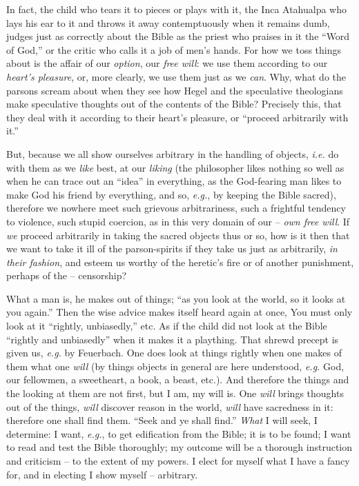 In fact, the child who tears it to pieces or plays with it, the Inca Atahualpa 
who lays his ear to it and throws it away contemptuously when it remains dumb, 
judges just as correctly about the Bible as the priest who praises in it the 
``Word of God,'' or the critic who calls it a job of men's hands. For how we 
toss things about is the affair of our \textit{option}, our \textit{free 
will}: we use them according to our \textit{heart's pleasure}, or, more 
clearly, we use them just as we \textit{can}. Why, what do the parsons scream 
about when they see how Hegel and the speculative theologians make speculative 
thoughts out of the contents of the Bible? Precisely this, that they deal with 
it according to their heart's pleasure, or ``proceed arbitrarily with it.''

But, because we all show ourselves arbitrary in the handling of objects, 
\textit{i.e.} do with them as we \textit{like} best, at our \textit{liking} 
(the philosopher likes nothing so well as when he can trace out an ``idea'' 
in everything, as the God-fearing man likes to make God his friend by 
everything, and so, \textit{e.g.}, by keeping the Bible sacred), therefore we 
nowhere meet such grievous arbitrariness, such a frightful tendency to 
violence, such stupid coercion, as in this very domain of our -- \textit{own 
free will}. If \textit{we} proceed arbitrarily in taking the sacred objects 
thus or so, how is it then that we want to take it ill of the parson-spirits 
if they take us just as arbitrarily, \textit{in their fashion}, and esteem us 
worthy of the heretic's fire or of another punishment, perhaps of the -- 
censorship?

What a man is, he makes out of things; ``as you look at the world, so it 
looks at you again.'' Then the wise advice makes itself heard again at once, 
You must only look at it ``rightly, unbiasedly,'' etc. As if the child did 
not look at the Bible ``rightly and unbiasedly'' when it makes it a 
plaything. That shrewd precept is given us, \textit{e.g.} by Feuerbach. One 
does look at things rightly when one makes of them what one \textit{will} (by 
things objects in general are here understood, \textit{e.g.} God, our 
fellowmen, a sweetheart, a book, a beast, etc.). And therefore the things and 
the looking at them are not first, but I am, my will is. One \textit{will} 
brings thoughts out of the things, \textit{will} discover reason in the world, 
\textit{will} have sacredness in it: therefore one shall find them. ``Seek 
and ye shall find.'' \textit{What} I will seek, I determine: I want, 
\textit{e.g.}, to get edification from the Bible; it is to be found; I want 
to read and test the Bible thoroughly; my outcome will be a thorough 
instruction and criticism -- to the extent of my powers. I elect for myself 
what I have a fancy for, and in electing I show myself -- arbitrary.

